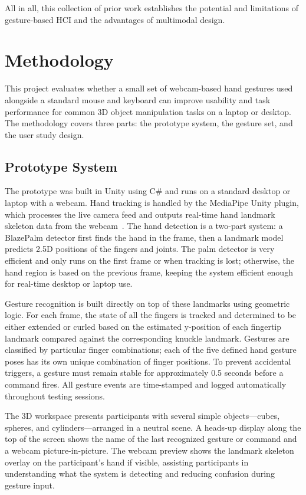 \documentclass[sigconf]{acmart}
\begin{document}
All in all, this collection of prior work establishes the potential and limitations of gesture-based HCI and the advantages of multimodal design.

\section{Methodology}

This project evaluates whether a small set of webcam-based hand gestures used alongside a standard mouse and keyboard can improve usability and task performance for common 3D object manipulation tasks on a laptop or desktop. The methodology covers three parts: the prototype system, the gesture set, and the user study design.

\subsection{Prototype System}

The prototype was built in Unity using C\# and runs on a standard desktop or laptop with a webcam. Hand tracking is handled by the MediaPipe Unity plugin, which processes the live camera feed and outputs real-time hand landmark skeleton data from the webcam~\cite{zhang2020}. The hand detection is a two-part system: a BlazePalm detector first finds the hand in the frame, then a landmark model predicts 2.5D positions of the fingers and joints. The palm detector is very efficient and only runs on the first frame or when tracking is lost; otherwise, the hand region is based on the previous frame, keeping the system efficient enough for real-time desktop or laptop use.

Gesture recognition is built directly on top of these landmarks using geometric logic. For each frame, the state of all the fingers is tracked and determined to be either extended or curled based on the estimated y-position of each fingertip landmark compared against the corresponding knuckle landmark. Gestures are classified by particular finger combinations; each of the five defined hand gesture poses has its own unique combination of finger positions. To prevent accidental triggers, a gesture must remain stable for approximately 0.5 seconds before a command fires. All gesture events are time-stamped and logged automatically throughout testing sessions.

The 3D workspace presents participants with several simple objects—cubes, spheres, and cylinders—arranged in a neutral scene. A heads-up display along the top of the screen shows the name of the last recognized gesture or command and a webcam picture-in-picture. The webcam preview shows the landmark skeleton overlay on the participant's hand if visible, assisting participants in understanding what the system is detecting and reducing confusion during gesture input.
\end{document}
